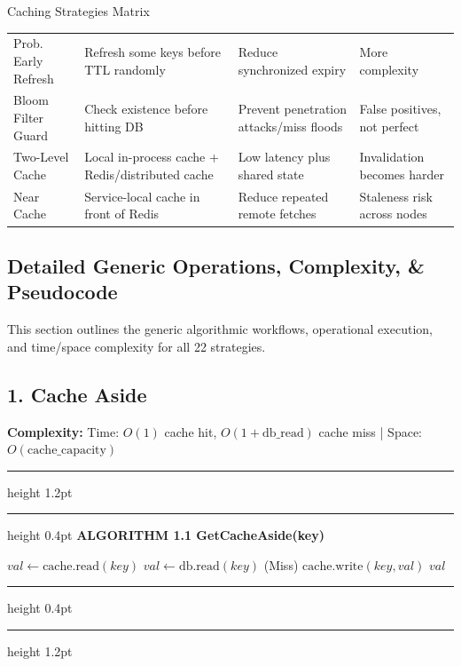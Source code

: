 \documentclass[11pt,a4paper]{article}
\newenvironment{textbookalgo}[2]{%
  \par\addvspace{1.2em}\noindent
  \hrule height 1.2pt
  \vspace{1.5pt}
  \hrule height 0.4pt
  \vspace{5pt}
  {\noindent\large\bfseries\sffamily ALGORITHM #1 \quad #2}
  \par\vspace{5pt}
  \RestyleAlgo{plain}
}{%
  \par\vspace{4pt}
  \hrule height 0.4pt
  \vspace{1.5pt}
  \hrule height 1.2pt
  \par\addvspace{1.2em}
}
\theoremstyle{definition}
\begin{document}
\begin{infobox}{Caching Strategies Matrix}
\begin{tabularx}{\textwidth}{lXXX}
\addlinespace
Prob. Early Refresh & Refresh some keys before TTL randomly & Reduce synchronized expiry & More complexity \\
\addlinespace
Bloom Filter Guard & Check existence before hitting DB & Prevent penetration attacks/miss floods & False positives, not perfect \\
\addlinespace
Two-Level Cache & Local in-process cache + Redis/distributed cache & Low latency plus shared state & Invalidation becomes harder \\
\addlinespace
Near Cache & Service-local cache in front of Redis & Reduce repeated remote fetches & Staleness risk across nodes \\
\bottomrule
\end{tabularx}
\end{infobox}

\subsection{Detailed Generic Operations, Complexity, \& Pseudocode}
This section outlines the generic algorithmic workflows, operational execution, and time/space complexity for all 22 strategies.

\clearpage
\subsection{1. Cache Aside}

\noindent
\textbf{Complexity:} Time: $O(1)$ cache hit, $O(1 + \text{db\_read})$ cache miss | Space: $O(\text{cache\_capacity})$
\smallskip

\begin{textbookalgo}{1.1}{GetCacheAside(key)}
\begin{algorithm}[H]
$val \leftarrow \text{cache.read}(key)$\;
$val \leftarrow \text{db.read}(key)$ (Miss)\;
$\text{cache.write}(key, val)$\;
\Return $val$\;
\end{algorithm}
\end{textbookalgo}
\end{document}
